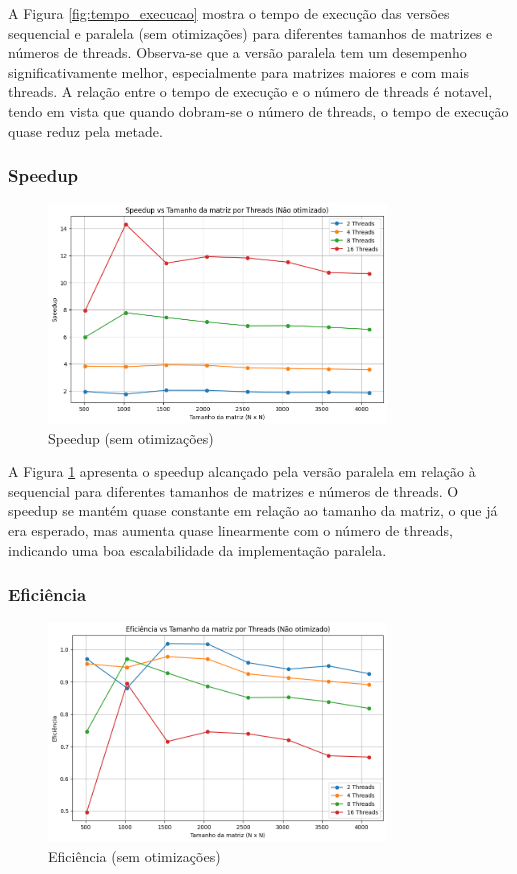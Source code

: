 \documentclass[12pt, a4paper]{article}
\begin{document}
	A Figura \ref{fig:tempo_execucao} mostra o tempo de execução das versões sequencial e paralela (sem otimizações) para diferentes tamanhos de matrizes e números de threads. Observa-se que a versão paralela tem um desempenho significativamente melhor, especialmente para matrizes maiores e com mais threads. A relação entre o tempo de execução e o número de threads é notavel, tendo em vista que quando dobram-se o número de threads, o tempo de execução quase reduz pela metade.

	\subsubsection{Speedup}

	\begin{figure}[H]
		\centering
		\includegraphics[width=0.8\textwidth]{img/speedup.png}
		\caption{Speedup (sem otimizações)}
		\label{fig:speedup}
	\end{figure}

	A Figura \ref{fig:speedup} apresenta o speedup alcançado pela versão paralela em relação à sequencial para diferentes tamanhos de matrizes e números de threads. O speedup se mantém quase constante em relação ao tamanho da matriz, o que já era esperado, mas aumenta quase linearmente com o número de threads, indicando uma boa escalabilidade da implementação paralela.

	\subsubsection{Eficiência}

	\begin{figure}[H]
		\centering
		\includegraphics[width=0.8\textwidth]{img/efficiency.png}
		\caption{Eficiência (sem otimizações)}
		\label{fig:eficiencia}
	\end{figure}
\end{document}
